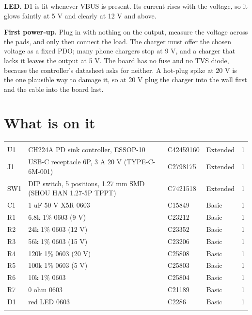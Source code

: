\textbf{LED.} D1 is lit whenever VBUS is present. Its current rises with the voltage, so it glows
faintly at 5 V and clearly at 12 V and above.

\textbf{First power-up.} Plug in with nothing on the output, measure the voltage across the pads,
and only then connect the load. The charger must offer the chosen voltage as a fixed PDO; many
phone chargers stop at 9 V, and a charger that lacks it leaves the output at 5 V. The board has no
fuse and no TVS diode, because the controller's datasheet asks for neither. A hot-plug spike at
20 V is the one plausible way to damage it, so at 20 V plug the charger into the wall first and the
cable into the board last.

\newpage
\section{What is on it}

\begin{hsblock}
\begin{tabularx}{\linewidth}{L{1.9cm}Y L{2.0cm}L{1.6cm}R{0.8cm}}
\hstoprule
{} &  &  &  &  \\
\hstoprule
U1 & CH224A PD sink controller, ESSOP-10 & C42459160 & Extended & 1 \\ \hline
J1 & USB-C receptacle 6P, 3 A 20 V (TYPE-C-6M-001) & C2798175 & Extended & 1 \\ \hline
SW1 & DIP switch, 5 positions, 1.27 mm SMD (SHOU HAN 1.27-5P TPPT) & C7421518 & Extended & 1 \\ \hline
C1 & 1 uF 50 V X5R 0603 & C15849 & Basic & 1 \\ \hline
R1 & 6.8k 1\% 0603 (9 V) & C23212 & Basic & 1 \\ \hline
R2 & 24k 1\% 0603 (12 V) & C23352 & Basic & 1 \\ \hline
R3 & 56k 1\% 0603 (15 V) & C23206 & Basic & 1 \\ \hline
R4 & 120k 1\% 0603 (20 V) & C25808 & Basic & 1 \\ \hline
R5 & 100k 1\% 0603 (5 V) & C25803 & Basic & 1 \\ \hline
R6 & 10k 1\% 0603 & C25804 & Basic & 1 \\ \hline
R7 & 0 ohm 0603 & C21189 & Basic & 1 \\ \hline
D1 & red LED 0603 & C2286 & Basic & 1 \\
\hstoprule
\end{tabularx}
\end{hsblock}

